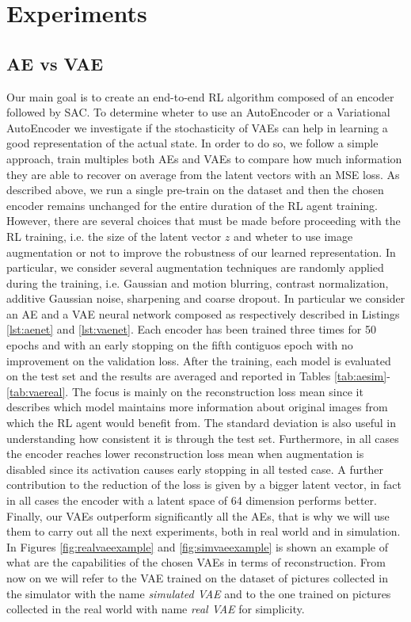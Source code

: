 \chapter{Experiments}

\section{AE vs VAE}

Our main goal is to create an end-to-end RL algorithm composed of an encoder followed by SAC. To determine wheter to use an AutoEncoder or a Variational AutoEncoder we investigate if the stochasticity of VAEs can help in learning a good representation of the actual state. In order to do so, we follow a simple approach, train multiples both AEs and VAEs to compare how much information they are able to recover on average from the latent vectors with an MSE loss. As described above, we run a single pre-train on the dataset and then the chosen encoder remains unchanged for the entire duration of the RL agent training. However, there are several choices that must be made before proceeding with the RL training, i.e. the size of the latent vector $z$ and wheter to use image augmentation or not to improve the robustness of our learned representation. In particular, we consider several augmentation techniques are randomly applied during the training, i.e. Gaussian and motion blurring, contrast normalization, additive Gaussian noise, sharpening and coarse dropout. In particular we consider an AE and a VAE neural network composed as respectively described in Listings \ref{lst:aenet} and \ref{lst:vaenet}. Each encoder has been trained three times for 50 epochs and with an early stopping on the fifth contiguos epoch with no improvement on the validation loss. After the training, each model is evaluated on the test set and the results are averaged and reported in Tables \ref{tab:aesim}-\ref{tab:vaereal}. The focus is mainly on the reconstruction loss mean since it describes which model maintains more information about original images from which the RL agent would benefit from. The standard deviation is also useful in understanding how consistent it is through the test set. Furthermore, in all cases the encoder reaches lower reconstruction loss mean when augmentation is disabled since its activation causes early stopping in all tested case. A further contribution to the reduction of the loss is given by a bigger latent vector, in fact in all cases the encoder with a latent space of 64 dimension performs better. Finally, our VAEs outperform significantly all the AEs, that is why we will use them to carry out all the next experiments, both in real world and in simulation. In Figures \ref{fig:realvaeexample} and \ref{fig:simvaeexample} is shown an example of what are the capabilities of the chosen VAEs in terms of reconstruction. From now on we will refer to the VAE trained on the dataset of pictures collected in the simulator with the name \textit{simulated VAE} and to the one trained on pictures collected in the real world with name \textit{real VAE} for simplicity. 



